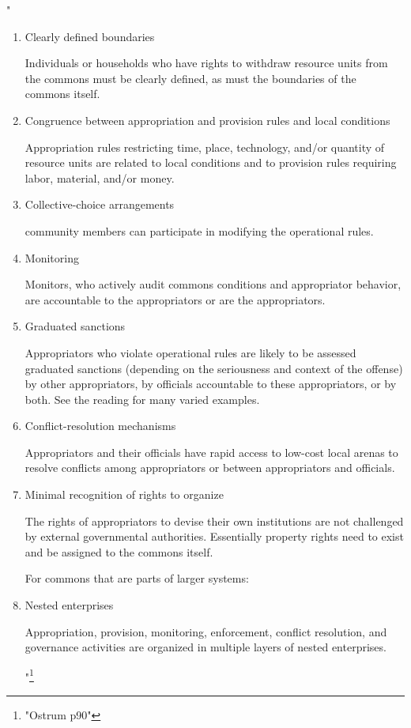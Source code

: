\documentclass{article}
\begin{document}
"
\begin{enumerate}

\item {Clearly defined boundaries}

Individuals or households who have rights to withdraw resource units from the commons must be clearly defined, as must the boundaries of the commons itself.


\item{ Congruence between appropriation and provision rules and local conditions}

 Appropriation rules restricting time, place, technology, and/or quantity of resource units are related to local conditions and to provision rules requiring labor, material, and/or money.


\item{Collective-choice arrangements}

community members can participate in modifying the operational rules.


\item{Monitoring}

Monitors, who actively audit commons conditions and appropriator behavior, are accountable to the appropriators or are the appropriators.


\item{Graduated sanctions}

Appropriators who violate operational rules are likely to be assessed graduated sanctions (depending on the seriousness and context of the offense) by other appropriators, by officials accountable to these appropriators, or by both. See the reading for many varied examples. 


\item{Conflict-resolution mechanisms}

Appropriators and their officials have rapid access to low-cost local arenas to resolve conflicts among appropriators or between appropriators and officials.



\item{Minimal recognition of rights to organize}

The rights of appropriators to devise their own institutions are not challenged by external governmental authorities. Essentially property rights need to exist and be assigned to the commons itself. 

For commons that are parts of larger systems:

\item{Nested enterprises}

Appropriation, provision, monitoring, enforcement, conflict resolution, and governance activities are organized in multiple layers of nested enterprises.

"\footnote{"Ostrum p90"}

\end{enumerate}
\end{document}

